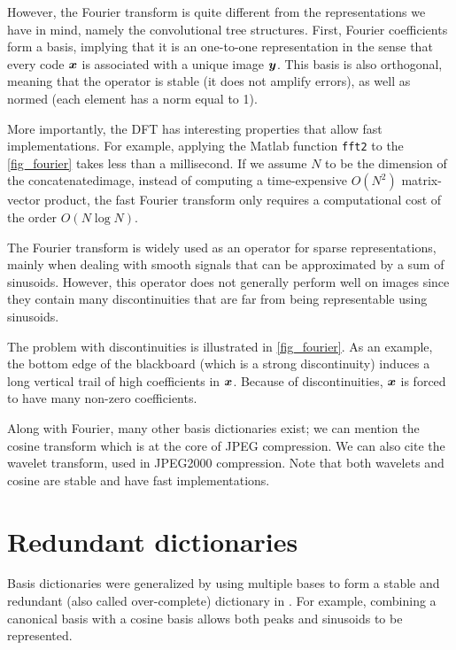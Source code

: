 \noindent
However, the Fourier transform is quite different from the representations we have in mind, namely the convolutional tree structures. First, Fourier coefficients form a basis, implying that it is an one-to-one representation in the sense that every code $\bm{x}$ is associated with a unique image $\bm{y}$. This basis is also orthogonal, meaning that the operator is stable (it does not amplify errors), as well as normed (each element has a norm equal to 1).

\noindent
More importantly, the \ac{DFT} has interesting properties that allow fast implementations. For example, applying the Matlab function \texttt{fft2} to the \cref{fig_fourier} takes less than a millisecond. If we assume $N$ to be the dimension of the concatenated\footnotemark[2] image, instead of computing a time-expensive $O(N^2)$ matrix-vector product, the fast Fourier transform only requires a computational cost of the order $O(N \log N)$.


\noindent
The Fourier transform is widely used as an operator for sparse representations, mainly when dealing with smooth signals that can be approximated by a sum of sinusoids. However, this operator does not generally perform well on images since they contain many discontinuities that are far from being representable using sinusoids.

\noindent
The problem with discontinuities is illustrated in \cref{fig_fourier}. As an example, the bottom edge of the blackboard (which is a strong discontinuity) induces a long vertical trail of high coefficients in $\bm{x}$. Because of discontinuities, $\bm{x}$ is forced to have many non-zero coefficients. 

\noindent
Along with Fourier, many other basis dictionaries exist; we can mention the cosine transform which is at the core of JPEG compression. We can also cite the wavelet transform, used in JPEG2000 compression. Note that both wavelets and cosine are stable and have fast implementations.

\section{Redundant dictionaries}

Basis dictionaries were generalized by using multiple bases to form a stable and redundant (also called over-complete) dictionary in \cite{shaobing_chen_atomic_2001}. For example, combining a canonical basis with a cosine basis allows both peaks and sinusoids to be represented.

